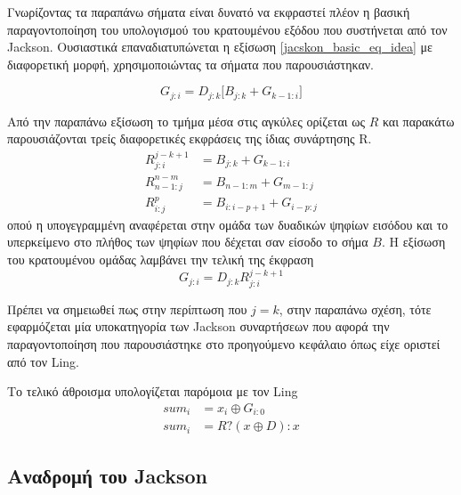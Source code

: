 Γνωρίζοντας τα παραπάνω σήματα είναι δυνατό να εκφραστεί πλέον η βασική 
παραγοντοποίηση του υπολογισμού του κρατουμένου εξόδου
που συστήνεται από τον Jackson. Ουσιαστικά επαναδιατυπώνεται η εξίσωση \ref{jacskon_basic_eq_idea} με διαφορετική μορφή, χρησιμοποιώντας τα σήματα που παρουσιάστηκαν. 

\begin{equation}
    G_{j:i} = D_{j:k} \Big[B_{j:k}+G_{k-1:i}\Big]
\end{equation}

Από την παραπάνω εξίσωση το τμήμα μέσα στις αγκύλες ορίζεται ως $R$ και παρακάτω παρουσιάζονται τρείς διαφορετικές εκφράσεις της ίδιας συνάρτησης R. 
\begin{equation}
\begin{split}
    R^{j-k+1}_{j:i} &= B_{j:k}+G_{k-1:i}\\
    R^{n-m}_{n-1:j} &= B_{n-1:m} + G_{m-1:j}\\
    R^p_{i:j} &= B_{i:i-p+1}+G_{i-p:j}  
\end{split}
\end{equation}
οπού η υπογεγραμμένη αναφέρεται στην ομάδα των
δυαδικών ψηφίων εισόδου και το υπερκείμενο στο πλήθος των ψηφίων
που δέχεται σαν είσοδο το σήμα $B$. Η εξίσωση του κρατουμένου ομάδας λαμβάνει την τελική της έκφραση
\begin{equation}
    G_{j:i} = D_{j:k} R^{j-k+1}_{j:i}
\end{equation}

Πρέπει να σημειωθεί πως στην περίπτωση που $j=k$, στην παραπάνω σχέση, 
τότε εφαρμόζεται μία υποκατηγορία των Jackson συναρτήσεων που αφορά την παραγοντοποίηση που παρουσιάστηκε στο προηγούμενο κεφάλαιο όπως είχε οριστεί από τον Ling.

Το τελικό άθροισμα υπολογίζεται παρόμοια με τον Ling
\begin{equation}
    \label{Jackson_sum_mult}
    \begin{split}
        sum_i &= x_i \oplus G_{i:0}\\
        sum_i &= R ? ( x \oplus D) : x 
    \end{split}
\end{equation}












\subsection{Αναδρομή του Jackson }

